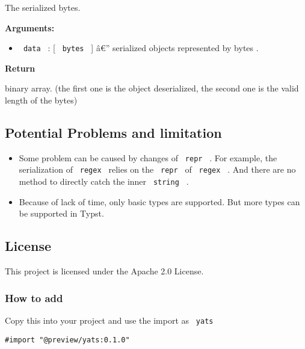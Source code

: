 The serialized bytes.

\begin{Shaded}
\begin{Highlighting}[]
\end{Highlighting}
\end{Shaded}

\textbf{Arguments:}

\begin{itemize}
\tightlist
\item
  \texttt{\ data\ } : {[} \texttt{\ bytes\ } {]} â€'' serialized objects
  represented by bytes .
\end{itemize}

\textbf{Return}

binary array. (the first one is the object deserialized, the second one
is the valid length of the bytes)

\subsection{Potential Problems and
limitation}\label{potential-problems-and-limitation}

\begin{itemize}
\item
  Some problem can be caused by changes of \texttt{\ repr\ } . For
  example, the serialization of \texttt{\ regex\ } relies on the
  \texttt{\ repr\ } of \texttt{\ regex\ } . And there are no method to
  directly catch the inner \texttt{\ string\ } .
\item
  Because of lack of time, only basic types are supported. But more
  types can be supported in Typst.
\end{itemize}

\subsection{License}\label{license}

This project is licensed under the Apache 2.0 License.

\subsubsection{How to add}\label{how-to-add}

Copy this into your project and use the import as \texttt{\ yats\ }

\begin{verbatim}
#import "@preview/yats:0.1.0"
\end{verbatim}


